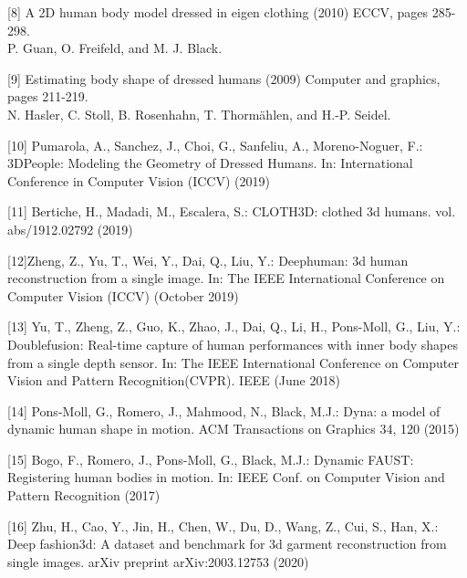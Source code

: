 [8] A 2D human body model dressed in eigen clothing (2010)
ECCV, pages 285-298.\\
P. Guan, O. Freifeld, and M. J. Black.

\medskip

[9] Estimating body shape of dressed humans (2009)
Computer and graphics, pages 211-219.\\
N. Hasler, C. Stoll, B. Rosenhahn, T. Thormählen, and H.-P. Seidel.

\medskip

[10] Pumarola, A., Sanchez, J., Choi, G., Sanfeliu, A., Moreno-Noguer, F.: 3DPeople:
Modeling the Geometry of Dressed Humans. In: International Conference in Computer Vision (ICCV) (2019)

\medskip

[11] Bertiche, H., Madadi, M., Escalera, S.: CLOTH3D: clothed 3d humans. vol.
abs/1912.02792 (2019)

\medskip

[12]Zheng, Z., Yu, T., Wei, Y., Dai, Q., Liu, Y.: Deephuman: 3d human reconstruction
from a single image. In: The IEEE International Conference on Computer Vision
(ICCV) (October 2019)

\medskip

[13] Yu, T., Zheng, Z., Guo, K., Zhao, J., Dai, Q., Li, H., Pons-Moll, G., Liu, Y.:
Doublefusion: Real-time capture of human performances with inner body shapes
from a single depth sensor. In: The IEEE International Conference on Computer
Vision and Pattern Recognition(CVPR). IEEE (June 2018)

\medskip

[14] Pons-Moll, G., Romero, J., Mahmood, N., Black, M.J.: Dyna: a model of dynamic
human shape in motion. ACM Transactions on Graphics 34, 120 (2015)

\medskip

[15] Bogo, F., Romero, J., Pons-Moll, G., Black, M.J.: Dynamic FAUST: Registering
human bodies in motion. In: IEEE Conf. on Computer Vision and Pattern Recognition (2017)

\medskip

[16] Zhu, H., Cao, Y., Jin, H., Chen, W., Du, D., Wang, Z., Cui, S., Han, X.: Deep
fashion3d: A dataset and benchmark for 3d garment reconstruction from single
images. arXiv preprint arXiv:2003.12753 (2020)